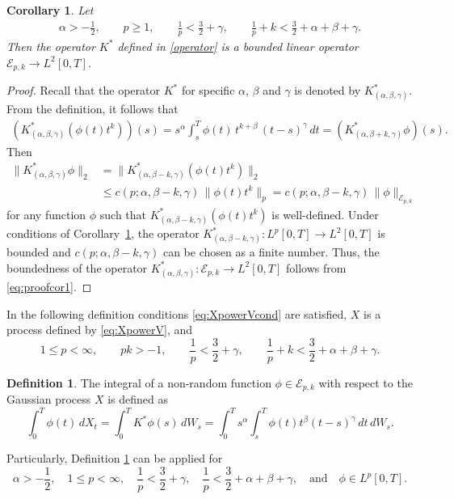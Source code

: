 \documentclass{article}
\theoremstyle{plain}
\newtheorem{corollary}{Corollary}
\theoremstyle{remark}
\theoremstyle{definition}
\newtheorem{definition}{Definition}
\begin{document}
\begin{corollary}
	\label{corollary:ELbound}
	Let
	\begin{gather*}
		\alpha>-\frac12,
		\qquad
		p\ge 1,
		\qquad
		\frac{1}{p} < \frac32+\gamma, \qquad
		\frac{1}{p} + k < \frac32 + \alpha+\beta+\gamma .
	\end{gather*}
	Then the operator $K^*$ defined in \eqref{operator}
	is a bounded linear operator $\mathcal{E}_{p,k}\to  L^2[0,T]$.
\end{corollary}
\begin{proof}
Recall that
the operator $K^*$ for specific $\alpha$, $\beta$ and
$\gamma$ is denoted by  $K^*_{(\alpha,\beta,\gamma)}$.
From the definition, it follows that
\begin{gather*}
(K^*_{(\alpha,\beta,\gamma)}
(\phi(t) t^k))  (s) =
s^\alpha \int_s^T \! \phi(t) \, t^{k+\beta} \, (t-s)^\gamma\, dt
=(K^*_{(\alpha,\beta+k,\gamma)} \phi) (s).
\end{gather*}
Then
\begin{align}
\|K^*_{(\alpha,\beta,\gamma)} \phi\|_2
&=
\|K^*_{(\alpha,\beta-k,\gamma)} (\phi(t) t^k)\|_2
\nonumber \\ &\le
c(p; \alpha, \beta{-}k, \gamma) \, \|\phi(t) t^k\|_p
=
c(p; \alpha, \beta{-}k, \gamma) \, \|\phi\|_{\mathcal{E}_{p,k}}
\label{eq:proofcor1}
\end{align}
for any function $\phi$ such that
$K^*_{(\alpha,\beta-k,\gamma)} (\phi(t) t^k)$ is well-defined.
Under conditions of Corollary~\ref{corollary:ELbound},
the operator
$K^*_{(\alpha,\beta-k,\gamma)} : L^p[0,T] \to L^2[0,T]$
is bounded and $c(p; \alpha, \beta{-}k, \gamma)$ can be chosen as a finite number.
Thus,
the boundedness of the operator
$K^*_{(\alpha,\beta,\gamma)} : \mathcal{E}_{p,k} \to L^2[0,T]$
follows from \eqref{eq:proofcor1}.
\end{proof}

In the following definition conditions \eqref{eq:XpowerVcond}
	are satisfied, $X$ is a process
	defined by \eqref{eq:XpowerV}, and
\[
	1 \le  p < \infty, \qquad
	p k > -1, \qquad
	\frac{1}{p} < \frac32 +\gamma, \qquad
	\frac{1}{p} + k < \frac32 + \alpha+\beta+\gamma .
\]
\begin{definition}\label{def-PLI-3p}
	The integral of a non-random function
	$\phi\in\mathcal{E}_{p,k}$
	with respect to the Gaussian process $X$
	is defined as
	\begin{equation}\label{eq:def-PLI-3p}
		\int_0^T \phi(t) \, dX_t
		= \int_0^T K^* \phi(s) \, dW_s
		= \int_0^T s^\alpha
		\int_s^T \phi(t) t^\beta (t-s)^\gamma \, dt
		\, dW_s.
	\end{equation}
\end{definition}
Particularly, Definition \ref{def-PLI-3p} can be applied for
\[
	\alpha>-\frac12,
	\quad
	1 \le p < \infty,
	\quad
	\frac{1}{p} < \frac32+\gamma, \quad
	\frac{1}{p} < \frac32 + \alpha+\beta+\gamma,
	\quad \mbox{and} \quad
	\phi \in L^p[0,T].
\]
\end{document}
